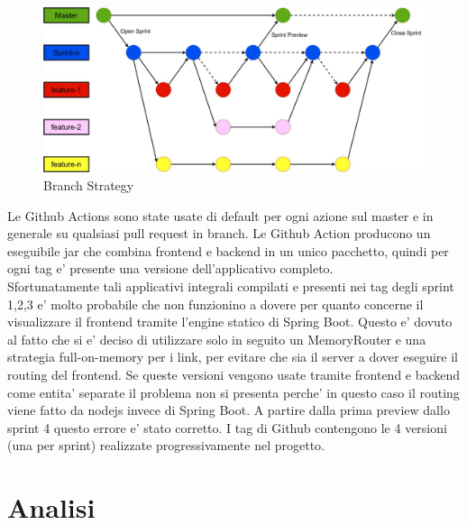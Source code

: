 \documentclass[a4paper,12pt]{report}
\begin{document}
	\begin{figure}[!h]
		\centering
		\includegraphics[width=0.9\linewidth]{image/branchStrategy.png}
		\caption{Branch Strategy}\label{fig:branchStrategy}
	\end{figure}
Le Github Actions sono state usate di default per ogni azione sul master e in generale su qualsiasi pull request in branch.
Le Github Action producono un eseguibile jar che combina frontend e backend in un unico pacchetto, quindi per ogni tag e' presente una versione dell'applicativo completo.\\
Sfortunatamente tali applicativi integrali compilati e presenti nei tag degli sprint 1,2,3 e' molto probabile che non funzionino a dovere per quanto concerne il visualizzare il frontend tramite l'engine statico di Spring Boot.
Questo e' dovuto al fatto che si e' deciso di utilizzare solo in seguito un MemoryRouter e una strategia full-on-memory per i link, per evitare che sia il server a dover eseguire il routing del frontend. Se queste versioni vengono usate tramite frontend e backend come entita' separate il problema non si presenta perche' in questo caso il routing viene fatto da nodejs invece di Spring Boot.
A partire dalla prima preview dallo sprint 4 questo errore e' stato corretto.
I tag di Github contengono le 4 versioni (una per sprint) realizzate progressivamente nel progetto.
\newpage
    \chapter{Analisi}
\end{document}
